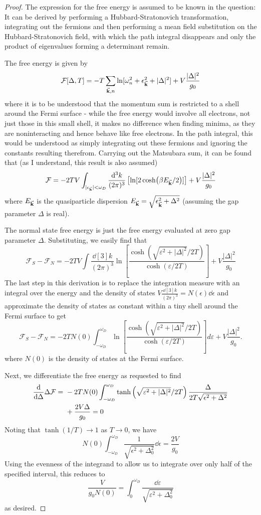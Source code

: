 \begin{proof}
	The expression for the free energy is assumed to be known in the question: It can be derived by performing a Hubbard-Stratonovich transformation, integrating out the fermions and then performing a mean field substitution on the Hubbard-Stratonovich field, with which the path integral disappears and only the product of eigenvalues forming a determinant remain.
	
	The free energy is given by
	\[\mathcal{F}[\Delta, T] = -T\sum_{\va k, n}\ln[\omega_n^2+\epsilon_{\va k}^2+|\Delta|^2]+V\frac{|\Delta|^2}{g_0}\]
	where it is to be understood that the momentum sum is restricted to a shell around the Fermi surface - while the free energy would involve all electrons, not just those in this small shell, it makes no difference when finding minima, as they are noninteracting and hence behave like free electrons. In the path integral, this would be understood as simply integrating out these fermions and ignoring the constants resulting therefrom. Carrying out the Matsubara sum, it can be found that (as I understand, this result is also assumed)
	\[\mathcal{F}= -2TV\int_{|\epsilon_{\va k}|<\omega_D}\frac{\dd[3]{k}}{(2\pi)^3}\left[\ln[2\cosh(\beta E_{\va k}/2)]\right]+V\frac{|\Delta|^2}{g_0}\]
	where $E_{\va k}$ is the quasiparticle dispersion $E_{\va k} = \sqrt{\epsilon_{\va k}^2 + \Delta^2}$ (assuming the gap parameter $\Delta$ is real).
	
	The normal state free energy is just the free energy evaluated at zero gap parameter $\Delta$. Substituting, we easily find that
	\[\mathcal{F}_S-\mathcal{F}_N = -2TV \int \frac{\dd[3]{k}}{(2\pi)^3}\ln \left[\frac{\cosh\left(\sqrt{\varepsilon^2+|\Delta|^2}/2T\right)}
	{\cosh(\varepsilon/2T)}\right]+V\frac{|\Delta|^2}{g_0}\]
	The last step in this derivation is to replace the integration measure with an integral over the energy and the density of states $V\frac{\dd[3]{k}}{(2\pi)^3}=N(\epsilon)\dd{\epsilon}$ and approximate the density of states as constant within a tiny shell around the Fermi surface to get
\[\mathcal{F}_S - \mathcal{F}_N =
-2T N(0) \int_{-\omega_D}^{\omega_D}
\ln\!\left[
\frac{\cosh\!\left(\sqrt{\varepsilon^2+|\Delta|^2}/2T\right)}
{\cosh(\varepsilon/2T)}
\right] d\varepsilon
+ V \frac{|\Delta|^2}{g_0}.\]
	where $N(0)$ is the density of states at the Fermi surface.
	
	Next, we differentiate the free energy as requested to find
	\begin{align*}
		\dv{\Delta}\Delta\mathcal{F}=&~ -2TN(0)\int_{-\omega_D}^{\omega_D} \tanh\left(\sqrt{\varepsilon^2+|\Delta|^2}/2T\right)\frac{\Delta}{2T\sqrt{\epsilon^2+\Delta^2}}\\
		&~+\frac{2V\Delta}{g_0}=0
	\end{align*}
Noting that $\tanh(1/T)\to 1$ as $T\to 0$, we have
\[N(0)\int_{-\omega_D}^{\omega_D} \frac{1}{\sqrt{\epsilon^2+\Delta^2_0}}\dd{\epsilon}=\frac{2V}{g_0}\]
Using the evenness of the integrand to allow us to integrate over only half of the specified interval, this reduces to
\[\frac{V}{g_0 N(0)} =
\int_0^{\omega_D} \frac{\dd\varepsilon}{\sqrt{\varepsilon^2+\Delta_0^2}}\]
as desired.


\end{proof}
